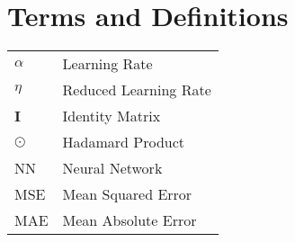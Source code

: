 \documentclass[a4paper,12pt,hidelinks]{report}
\begin{document}
\nocite{*}

\chapter*{Terms and Definitions}
\begin{tabular}{l | l}
\(\alpha\) & Learning Rate \\
\(\eta\) & Reduced Learning Rate \\
\textbf{I} & Identity Matrix \\
\(\odot\)& Hadamard Product \\
NN & Neural Network \\
MSE & Mean Squared Error \\
MAE & Mean Absolute Error \\
\end{tabular}

\newpage
%

%
%
%



%
\end{document}
